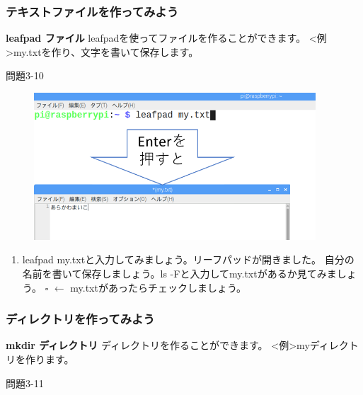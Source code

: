 \documentclass[a4paper,dvipdfmx]{jarticle}
\begin{document}
\subsubsection{}
\clearpage\subsubsection{テキストファイルを作ってみよう}
\textbf{leafpad ファイル}\newline
leafpadを使ってファイルを作ることができます。\newline
{\textless}例{\textgreater}my.txtを作り、文字を書いて保存します。

{\ttfamily
問題3-10}

\begin{figure}
\centering
\includegraphics[width=10.539cm,height=5.498cm]{text03-img/text03-img020.png}
\end{figure}
\begin{enumerate}
\item leafpad
my.txtと入力してみましょう。リーフパッドが開きました。\newline
自分の名前を書いて保存しましょう。ls
{}-Fと入力してmy.txtがあるか見てみましょう。\newline
${\square}$ $\leftarrow $
my.txtがあったらチェックしましょう。\newline

\end{enumerate}
\subsubsection{ディレクトリを作ってみよう}
\textbf{mkdir ディレクトリ}\newline
ディレクトリを作ることができます。\newline
{\textless}例{\textgreater}myディレクトリを作ります。

{\ttfamily
問題3-11}
\end{document}
